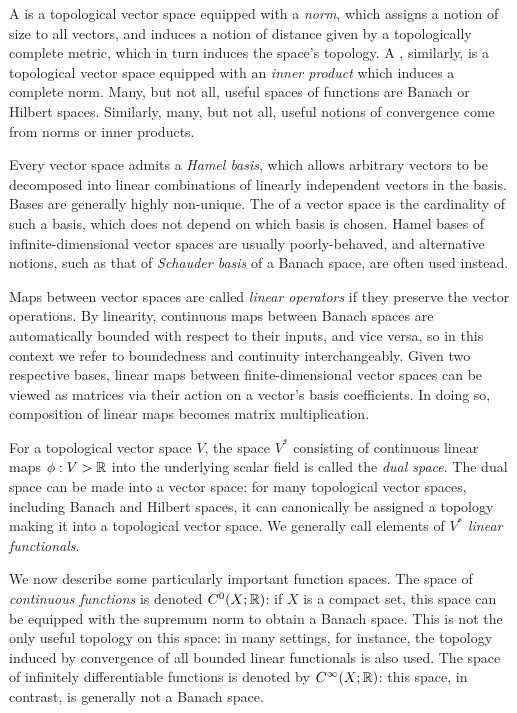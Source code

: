 \documentclass[11pt]{book}
\begin{document}
A  is a topological vector space equipped with a \emph{norm}, which assigns a notion of size to all vectors, and induces a notion of distance given by a topologically complete metric, which in turn induces the space's topology.
A , similarly, is a topological vector space equipped with an \emph{inner product} which induces a complete norm.
Many, but not all, useful spaces of functions are Banach or Hilbert spaces.
Similarly, many, but not all, useful notions of convergence come from norms or inner products.

Every vector space admits a \emph{Hamel basis}, which allows arbitrary vectors to be decomposed into linear combinations of linearly independent vectors in the basis.
Bases are generally highly non-unique.
The  of a vector space is the cardinality of such a basis, which does not depend on which basis is chosen.
Hamel bases of infinite-dimensional vector spaces are usually poorly-behaved, and alternative notions, such as that of \emph{Schauder basis} of a Banach space, are often used instead.

Maps between vector spaces are called \emph{linear operators} if they preserve the vector operations.
By linearity, continuous maps between Banach spaces are automatically bounded with respect to their inputs, and vice versa, so in this context we refer to boundedness and continuity interchangeably.
Given two respective bases, linear maps between finite-dimensional vector spaces can be viewed as matrices via their action on a vector's basis coefficients.
In doing so, composition of linear maps becomes matrix multiplication.

For a topological vector space $V$, the space $V^*$ consisting of continuous linear maps $\phi : V \-> \mathbb{R}$ into the underlying scalar field is called the \emph{dual space}.
The dual space can be made into a vector space: for many topological vector spaces, including Banach and Hilbert spaces, it can canonically be assigned a topology making it into a topological vector space.
We generally call elements of $V^*$ \emph{linear functionals}.

We now describe some particularly important function spaces.
The space of \emph{continuous functions} is denoted $C^0(X;\mathbb{R})$: if $X$ is a compact set, this space can be equipped with the supremum norm to obtain a Banach space.
This is not the only useful topology on this space: in many settings, for instance, the topology induced by convergence of all bounded linear functionals is also used.
The space of infinitely differentiable functions is denoted by $C^\infty(X;\mathbb{R})$: this space, in contrast, is generally not a Banach space.
\end{document}
